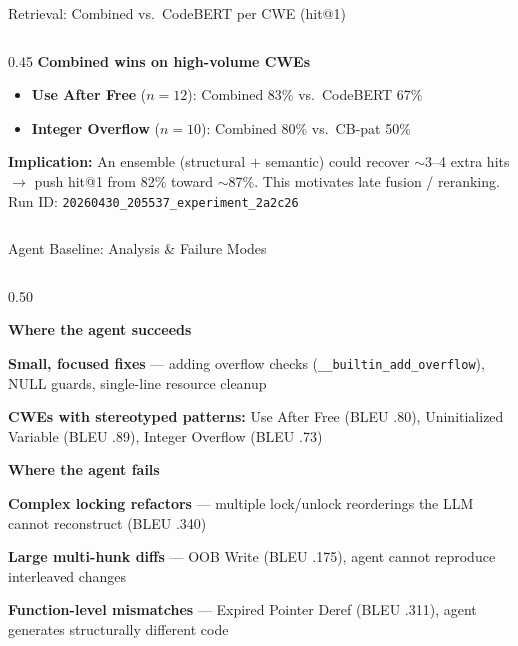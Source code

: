 \documentclass[aspectratio=169,10pt]{beamer}
\begin{document}
\begin{frame}{Retrieval: Combined vs.\ CodeBERT per CWE (hit@1)}
\begin{columns}[T]
\begin{column}{0.45\textwidth}
  \vspace{0.4em}
  \textbf{Combined wins on high-volume CWEs}

  \vspace{0.3em}
  {\scriptsize
  \begin{itemize}\setlength{\itemsep}{3pt}
    \item \textbf{Use After Free} ($n{=}12$):
          Combined 83\% vs.\ CodeBERT 67\%
    \item \textbf{Integer Overflow} ($n{=}10$):
          Combined 80\% vs.\ CB-pat 50\%
  \end{itemize}}

  \vspace{0.4em}
  {\scriptsize\textcolor{c1}{}
  \textbf{Implication:} An ensemble (structural $+$ semantic)
  could recover $\sim$3--4 extra hits $\to$ push hit@1
  from 82\% toward $\sim$87\%.
  This motivates late fusion / reranking.\\
  Run ID: \texttt{20260430\_205537\_experiment\_2a2c26}}

\end{column}
\end{columns}
\end{frame}


\begin{frame}{Agent Baseline: Analysis \& Failure Modes}
\begin{columns}[T]
\begin{column}{0.50\textwidth}

  \textbf{\textcolor{hit}{Where the agent succeeds}}
  \begin{itemize}\setlength{\itemsep}{2pt}
    {\scriptsize
    \item \textbf{Small, focused fixes} --- adding overflow checks
          (\texttt{\_\_builtin\_add\_overflow}), NULL guards, single-line
          resource cleanup
    \item \textbf{CWEs with stereotyped patterns:}
          Use After Free (BLEU .80),
          Uninitialized Variable (BLEU .89),
          Integer Overflow (BLEU .73)}
  \end{itemize}

  \vspace{0.5em}
  \textbf{\textcolor{miss}{Where the agent fails}}
  \begin{itemize}\setlength{\itemsep}{2pt}
    {\scriptsize
    \item \textbf{Complex locking refactors} --- multiple lock/unlock
          reorderings the LLM cannot reconstruct (BLEU .340)
    \item \textbf{Large multi-hunk diffs} --- OOB Write (BLEU .175),
          agent cannot reproduce interleaved changes
    \item \textbf{Function-level mismatches} --- Expired Pointer Deref
          (BLEU .311), agent generates structurally different code}
  \end{itemize}

\end{column}
\end{columns}
\end{frame}
\end{document}
